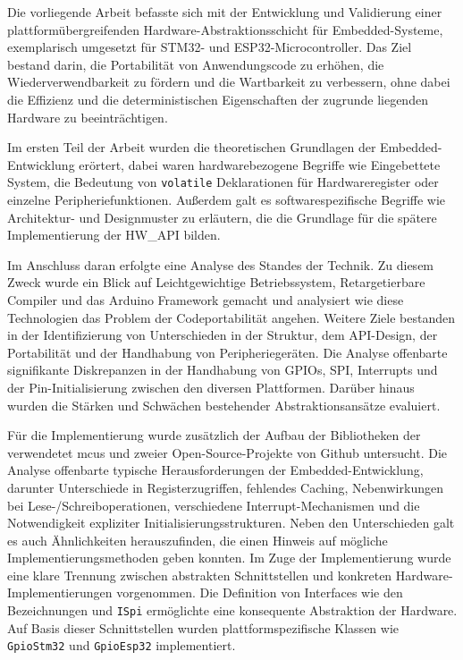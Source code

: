 
Die vorliegende Arbeit befasste sich mit der Entwicklung und Validierung einer plattformübergreifenden Hardware-Abstraktionsschicht für Embedded-Systeme, exemplarisch umgesetzt für STM32- und ESP32-Microcontroller. 
Das Ziel bestand darin, die Portabilität von Anwendungscode zu erhöhen, die Wiederverwendbarkeit zu fördern und die Wartbarkeit zu verbessern, ohne dabei die Effizienz und die deterministischen Eigenschaften der zugrunde liegenden Hardware zu beeinträchtigen.

Im ersten Teil der Arbeit wurden die theoretischen Grundlagen der Embedded-Entwicklung erörtert, dabei waren hardwarebezogene Begriffe wie Eingebettete System, die Bedeutung von \texttt{volatile} Deklarationen für Hardwareregister oder einzelne Peripheriefunktionen.
Außerdem galt es softwarespezifische Begriffe wie Architektur- und Designmuster zu erläutern, die die Grundlage für die spätere Implementierung der HW\_API bilden.

Im Anschluss daran erfolgte eine Analyse des Standes der Technik. 
Zu diesem Zweck wurde ein Blick auf Leichtgewichtige Betriebssystem, Retargetierbare Compiler und das Arduino Framework gemacht und analysiert wie diese Technologien das Problem der Codeportabilität angehen.
Weitere Ziele bestanden in der Identifizierung von Unterschieden in der Struktur, dem API-Design, der Portabilität und der Handhabung von Peripheriegeräten. 
Die Analyse offenbarte signifikante Diskrepanzen in der Handhabung von GPIOs, SPI, Interrupts und der Pin-Initialisierung zwischen den diversen Plattformen. 
Darüber hinaus wurden die Stärken und Schwächen bestehender Abstraktionsansätze evaluiert.

Für die Implementierung wurde zusätzlich der Aufbau der Bibliotheken der verwendetet \gls{mcu}s und zweier Open-Source-Projekte von Github untersucht.
Die Analyse offenbarte typische Herausforderungen der Embedded-Entwicklung, darunter Unterschiede in Registerzugriffen, fehlendes Caching, Nebenwirkungen bei Lese-/Schreiboperationen, verschiedene Interrupt-Mechanismen und die Notwendigkeit expliziter Initialisierungsstrukturen.
Neben den Unterschieden galt es auch Ähnlichkeiten herauszufinden, die einen Hinweis auf mögliche Implementierungsmethoden geben konnten.
Im Zuge der Implementierung wurde eine klare Trennung zwischen abstrakten Schnittstellen und konkreten Hardware-Implementierungen vorgenommen. 
Die Definition von Interfaces wie den Bezeichnungen  und \texttt{ISpi} ermöglichte eine konsequente Abstraktion der Hardware. 
Auf Basis dieser Schnittstellen wurden plattformspezifische Klassen wie \texttt{GpioStm32} und \texttt{GpioEsp32} implementiert.

